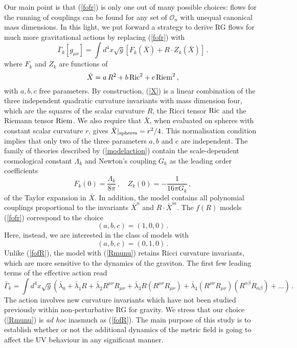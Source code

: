 \documentclass[notitlepage,eqsecnum,bm,amsmath,preprintnumbers,superscriptaddress,nofootinbib,aps,11pt]{revtex4-1}
\def\eq#1{(\ref{#1})}
\def\beq{\begin{equation}}
\def\eeq{\end{equation}}
\begin{document}
Our main  point is that \eq{fofr}  is only one out of many possible choices: flows for the running of couplings can be found for any set of $\mathcal{O}_n$ with unequal canonical mass dimensions. In this light, we put forward a strategy to derive RG flows for much more gravitational actions by replacing \eq{fofr} with
\beq\label{modelaction}
{\bar\Gamma}_k[g_{\mu\nu}] = \int d^4x \sqrt{g} \left[ F_k(\bar X) + R\cdot Z_k(\bar X)    \right]\,.
\eeq
where $F_k$ and $Z_k$ are  functions of 
\beq \label{X}
\bar X=a\, R^2 +b\, {\rm Ric}^2+c\, {\rm Riem}^2\,,
\eeq
with $a,b,c$ free parameters. By construction, \eq{X}  is a linear combination of the three independent quadratic curvature invariants with mass dimension four, which are the squares of the scalar curvature $R$, the Ricci tensor ${\rm Ric}$ and the Riemann tensor ${\rm Riem}$. We also require that $\bar X$, when evaluated on spheres with constant scalar curvature $r$, gives $\bar X|_{\rm spheres}=r^2/4$. This normalisation condition implies that only two of the three parameters $a,b$ and $c$ are independent. The family of theories described by \eq{modelaction} contain the scale-dependent cosmological constant $\Lambda_k$ and Newton's coupling $G_k$ as the leading order coefficients \beq
F_k(0)=\frac{\Lambda_k}{{8\pi}}\,,\quad Z_k(0)=-\frac{1}{16 \pi G_k}\,,
\eeq
 of the Taylor expansion in $\bar X$. In addition, the model contains all polynomial couplings proportional to the invariants $\bar X^n$ and  $R\cdot\bar X^m$.
The $f(R)$ models \eq{fofr} correspond to the  choice\beq \label{fofR}(a,b,c)=(1,0,0)\,.\eeq
Here, instead, we are interested in the class of models with
\beq \label{Rmunu}
(a,b,c)=(0,1,0)\,.
\eeq
Unlike \eq{fofR}, the model with \eq{Rmunu}  retains Ricci curvature invariants, which are more sensitive to the dynamics of the graviton.  The first few leading terms of the effective action read \cite{Nikolakopoulos:Thesis}
\beq\label{model}
\bar{\Gamma}_k = \int d^4x \sqrt{g} \left( \bar{\lambda}_0 + \bar{\lambda}_1 R  + \bar{\lambda}_{2} R^{\mu\nu}R_{\mu\nu} +  \bar{\lambda}_{3} R (R^{\mu\nu}R_{\mu\nu}) + \bar{\lambda}_4  (R^{\mu\nu}R_{\mu\nu})  (R^{\alpha\beta}R_{\alpha \beta} )+ ...    \right) \,.
\eeq
The action involves new curvature invariants which have not been studied previously within non-perturbative RG for gravity. We stress that our choice \eq{Rmunu} is {\it ad hoc} inasmuch as \eq{fofR}. The main purpose of this study is to establish whether or not the additional dynamics of the metric field is going to affect the UV behaviour in any significant manner. 
\end{document}

